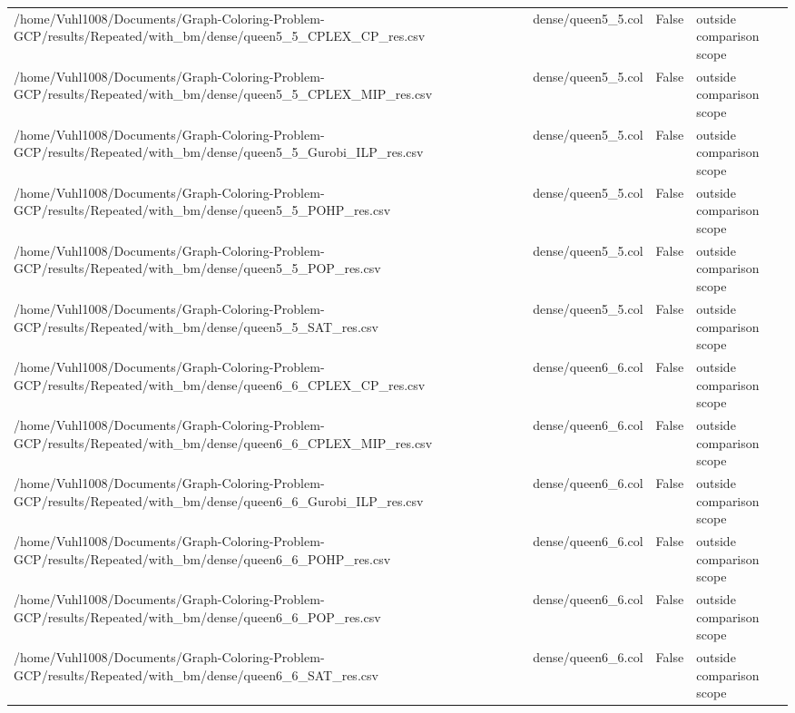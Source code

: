 \begin{table}[htbp]
\begin{tabular}{llll}
/home/Vuhl1008/Documents/Graph-Coloring-Problem-GCP/results/Repeated/with\_bm/dense/queen5\_5\_CPLEX\_CP\_res.csv & dense/queen5\_5.col & False & outside comparison scope \\
/home/Vuhl1008/Documents/Graph-Coloring-Problem-GCP/results/Repeated/with\_bm/dense/queen5\_5\_CPLEX\_MIP\_res.csv & dense/queen5\_5.col & False & outside comparison scope \\
/home/Vuhl1008/Documents/Graph-Coloring-Problem-GCP/results/Repeated/with\_bm/dense/queen5\_5\_Gurobi\_ILP\_res.csv & dense/queen5\_5.col & False & outside comparison scope \\
/home/Vuhl1008/Documents/Graph-Coloring-Problem-GCP/results/Repeated/with\_bm/dense/queen5\_5\_POHP\_res.csv & dense/queen5\_5.col & False & outside comparison scope \\
/home/Vuhl1008/Documents/Graph-Coloring-Problem-GCP/results/Repeated/with\_bm/dense/queen5\_5\_POP\_res.csv & dense/queen5\_5.col & False & outside comparison scope \\
/home/Vuhl1008/Documents/Graph-Coloring-Problem-GCP/results/Repeated/with\_bm/dense/queen5\_5\_SAT\_res.csv & dense/queen5\_5.col & False & outside comparison scope \\
/home/Vuhl1008/Documents/Graph-Coloring-Problem-GCP/results/Repeated/with\_bm/dense/queen6\_6\_CPLEX\_CP\_res.csv & dense/queen6\_6.col & False & outside comparison scope \\
/home/Vuhl1008/Documents/Graph-Coloring-Problem-GCP/results/Repeated/with\_bm/dense/queen6\_6\_CPLEX\_MIP\_res.csv & dense/queen6\_6.col & False & outside comparison scope \\
/home/Vuhl1008/Documents/Graph-Coloring-Problem-GCP/results/Repeated/with\_bm/dense/queen6\_6\_Gurobi\_ILP\_res.csv & dense/queen6\_6.col & False & outside comparison scope \\
/home/Vuhl1008/Documents/Graph-Coloring-Problem-GCP/results/Repeated/with\_bm/dense/queen6\_6\_POHP\_res.csv & dense/queen6\_6.col & False & outside comparison scope \\
/home/Vuhl1008/Documents/Graph-Coloring-Problem-GCP/results/Repeated/with\_bm/dense/queen6\_6\_POP\_res.csv & dense/queen6\_6.col & False & outside comparison scope \\
/home/Vuhl1008/Documents/Graph-Coloring-Problem-GCP/results/Repeated/with\_bm/dense/queen6\_6\_SAT\_res.csv & dense/queen6\_6.col & False & outside comparison scope \\
\hline
\end{tabular}
\end{table}
